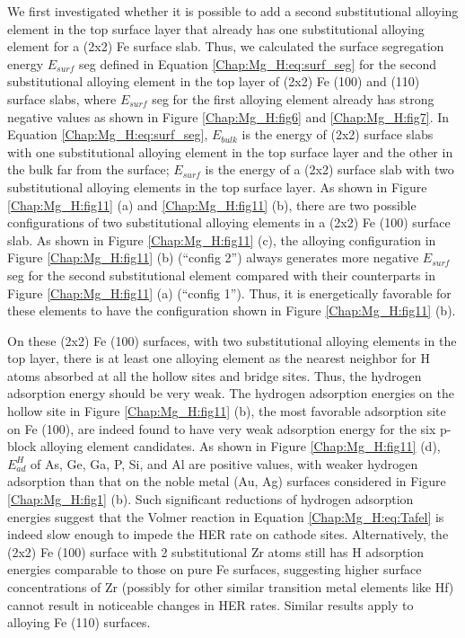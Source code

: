 We first investigated whether it is possible to add a second substitutional alloying element in the top surface layer that already has one substitutional alloying element for a (2x2) Fe surface slab. Thus, we calculated the surface segregation energy $E_{surf}$ seg defined in Equation \ref{Chap:Mg_H:eq:surf_seg} for the second substitutional alloying element in the top layer of (2x2) Fe (100) and (110) surface slabs, where $E_{surf}$ seg for the first alloying element already has strong negative values as shown in Figure \ref{Chap:Mg_H:fig6} and \ref{Chap:Mg_H:fig7}. In Equation \ref{Chap:Mg_H:eq:surf_seg}, $E_{bulk}$ is the energy of (2x2) surface slabs with one substitutional alloying element in the top surface layer and the other in the bulk far from the surface; $E_{surf}$ is the energy of a (2x2) surface slab with two substitutional alloying elements in the top surface layer. As shown in Figure \ref{Chap:Mg_H:fig11} (a) and \ref{Chap:Mg_H:fig11} (b), there are two possible configurations of two substitutional alloying elements in a (2x2) Fe (100) surface slab. As shown in Figure \ref{Chap:Mg_H:fig11} (c), the alloying configuration in Figure \ref{Chap:Mg_H:fig11} (b) (“config 2”) always generates more negative $E_{surf}$ seg for the second substitutional element compared with their counterparts in Figure \ref{Chap:Mg_H:fig11} (a) (“config 1”). Thus, it is energetically favorable for these elements to have the configuration shown in Figure \ref{Chap:Mg_H:fig11} (b).


On these (2x2) Fe (100) surfaces, with two substitutional alloying elements in the top layer, there is at least one alloying element as the nearest neighbor for H atoms absorbed at all the hollow sites and bridge sites. Thus, the hydrogen adsorption energy should be very weak. The hydrogen adsorption energies on the hollow site in Figure \ref{Chap:Mg_H:fig11} (b), the most favorable adsorption site on Fe (100), are indeed found to have very weak adsorption energy for the six p-block alloying element candidates. As shown in Figure \ref{Chap:Mg_H:fig11} (d), $E_{ad}^H$ of As, Ge, Ga, P, Si, and Al are positive values, with weaker hydrogen adsorption than that on the noble metal (Au, Ag) surfaces considered in Figure \ref{Chap:Mg_H:fig1} (b). Such significant reductions of hydrogen adsorption energies suggest that the Volmer reaction in Equation \ref{Chap:Mg_H:eq:Tafel} is indeed slow enough to impede the \ac{HER} rate on cathode sites. Alternatively, the (2x2) Fe (100) surface with 2 substitutional Zr atoms still has H adsorption energies comparable to those on pure Fe surfaces, suggesting higher surface concentrations of Zr (possibly for other similar transition metal elements like Hf) cannot result in noticeable changes in \ac{HER} rates. Similar results apply to alloying Fe (110) surfaces.


